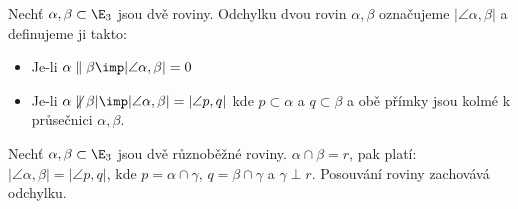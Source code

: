 \Def 
Nechť $\alpha,\beta \subset \E_3$ jsou dvě roviny. Odchylku dvou rovin $\alpha,\beta$ označujeme $|\angle \alpha,\beta|$
a definujeme ji takto:
\begin{itemize}
	\item Je-li $\alpha \parallel \beta \imp |\angle \alpha,\beta|=0$
	\item Je-li $\alpha \not\parallel \beta| \imp |\angle \alpha,\beta|=|\angle p,q|$ kde $p\subset \alpha $ a $q\subset\beta$ a  obě přímky jsou kolmé k průsečnici $\alpha,\beta$.
\end{itemize}
\V Nechť $\alpha,\beta \subset \E_3$ jsou dvě různoběžné roviny. $\alpha\cap\beta = r$, pak platí:
$|\angle\alpha,\beta|=|\angle p,q|$, kde $p=\alpha\cap\gamma$, $q=\beta\cap\gamma$ a $\gamma\perp r$.
\V Posouvání roviny zachovává odchylku.
\EndDoc


